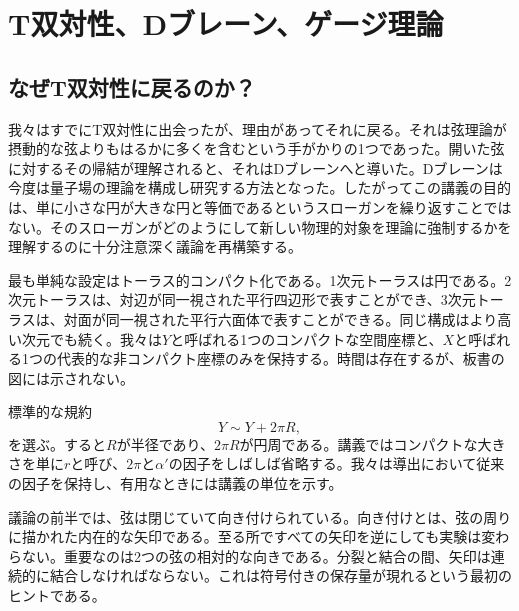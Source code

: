\chapter{T双対性、Dブレーン、ゲージ理論}


\section{なぜT双対性に戻るのか？}

我々はすでにT双対性に出会ったが、理由があってそれに戻る。それは弦理論が摂動的な弦よりもはるかに多くを含むという手がかりの1つであった。開いた弦に対するその帰結が理解されると、それはDブレーンへと導いた。Dブレーンは今度は量子場の理論を構成し研究する方法となった。したがってこの講義の目的は、単に小さな円が大きな円と等価であるというスローガンを繰り返すことではない。そのスローガンがどのようにして新しい物理的対象を理論に強制するかを理解するのに十分注意深く議論を再構築する。

最も単純な設定はトーラス的コンパクト化である。1次元トーラスは円である。2次元トーラスは、対辺が同一視された平行四辺形で表すことができ、3次元トーラスは、対面が同一視された平行六面体で表すことができる。同じ構成はより高い次元でも続く。我々は\(Y\)と呼ばれる1つのコンパクトな空間座標と、\(X\)と呼ばれる1つの代表的な非コンパクト座標のみを保持する。時間は存在するが、板書の図には示されない。

標準的な規約
\begin{equation}
  Y\sim Y+2\pi R,
  \label{eq:l10-circle-identification}
\end{equation}
を選ぶ。すると\(R\)が半径であり、\(2\pi R\)が円周である。講義ではコンパクトな大きさを単に\(r\)と呼び、\(2\pi\)と\(\alpha'\)の因子をしばしば省略する。我々は導出において従来の因子を保持し、有用なときには講義の単位を示す。

議論の前半では、弦は閉じていて向き付けられている。向き付けとは、弦の周りに描かれた内在的な矢印である。至る所ですべての矢印を逆にしても実験は変わらない。重要なのは2つの弦の相対的な向きである。分裂と結合の間、矢印は連続的に結合しなければならない。これは符号付きの保存量が現れるという最初のヒントである。

